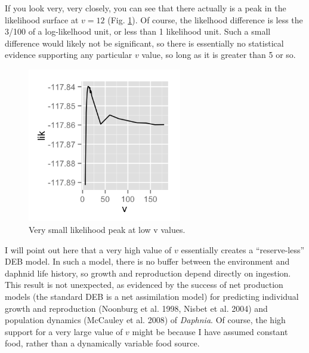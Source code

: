 \documentclass[12pt,reqno,final,pdftex]{amsart}\usepackage[]{graphicx}\usepackage[]{color}
\newenvironment{knitrout}{}{} %
\theoremstyle{plain}
\numberwithin{equation}{part}
\begin{document}
If you look very, very closely, you can see that there actually is a peak in the likelihood surface at $v=12$ (Fig. \ref{fig:v-lik-peak}).
Of course, the likelhood difference is less the 3/100 of a log-likelhood unit, or less than 1 likelihood unit.
Such a small difference would likely not be significant, so there is essentially no statistical evidence supporting any particular $v$ value, so long as it is greater than 5 or so.
\begin{knitrout}\scriptsize
{}\color{fgcolor}\begin{figure}

\includegraphics[width=0.6\textwidth]{figure/v-lik-peak-1} \hfill{}

\caption[Very small likelihood peak at low v values]{Very small likelihood peak at low v values.}\label{fig:v-lik-peak}
\end{figure}


\end{knitrout}

I will point out here that a very high value of $v$ essentially creates a ``reserve-less'' DEB model.
In such a model, there is no buffer between the environment and daphnid life history, so growth and reproduction depend directly on ingestion.
This result is not unexpected, as evidenced by the success of net production models (the standard DEB is a net assimilation model) for predicting individual growth and reproduction (Noonburg et al. 1998, Nisbet et al. 2004) and population dynamics (McCauley et al. 2008) of \emph{Daphnia}.
Of course, the high support for a very large value of $v$ might be because I have assumed constant food, rather than a dynamically variable food source.

\clearpage
\end{document}

